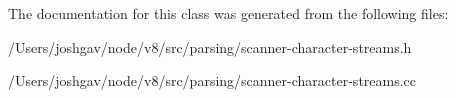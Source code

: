 The documentation for this class was generated from the following files\+:\begin{DoxyCompactItemize}
\item 
/\+Users/joshgav/node/v8/src/parsing/scanner-\/character-\/streams.\+h\item 
/\+Users/joshgav/node/v8/src/parsing/scanner-\/character-\/streams.\+cc\end{DoxyCompactItemize}
